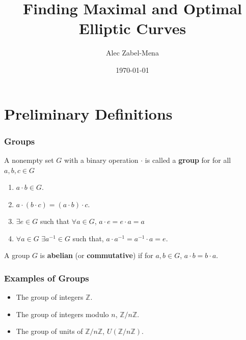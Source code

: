 \documentclass{beamer}
\title[Finding Maximal and Optimal Elliptic Curves]{Finding Maximal and Optimal Elliptic Curves} %
\author{Alec Zabel-Mena} %
\institute[UPR-RP] %
{
Universidad de Puerto Rico, Recinto de Rio Piedras \\ %
}
\date{\today} %
\newcommand{\Z}{\mathbb{Z}}
\theoremstyle{plain} %
\theoremstyle{definition}
\theoremstyle{remark}
\begin{document}
\begin{frame}
\titlepage %
\end{frame}



\section{Preliminary Definitions}
\begin{frame}
\frametitle{Groups}

\begin{definition} A nonempty set $G$ with a binary operation $\cdot$ is called a \textbf{group} for for all  $a,b,c \in G$
    \begin{enumerate}
        \item $a\cdot{b} \in G$.
        \item  $a\cdot{(b\cdot{c})}=(a\cdot{b})\cdot{c}$.
        \item $ \exists e \in G$ such that $ \forall a \in G$, $a\cdot{e}=e\cdot{a}=a$
        \item $\forall a \in G$ $\exists a^{-1} \in G$ such that, $a\cdot{a^{-1}}=a^{-1}\cdot{a}=e$.
    \end{enumerate}
\end{definition}

\begin{definition}
    A group $G$ is \textbf{abelian}  (or \textbf{commutative}) if for $a,b \in G$, $a\cdot{b}=b\cdot{a}$.
\end{definition}

\end{frame}

\begin{frame}
\frametitle{Examples of Groups}
\begin{itemize}
    \item The group of integers $\Z$.
    \item The group of integers modulo $n$, $\Z/n\Z$.
    \item The group of units of $\Z/n\Z$, $U(\Z/n\Z)$.
\end{itemize}


\end{frame}
\end{document}
